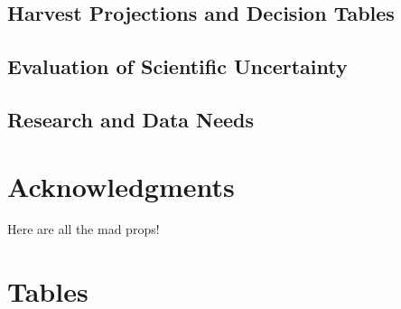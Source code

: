 \documentclass[11pt,
  english,
  a4paper,
]{article}
\begin{document}
\leavevmode\tagmcend\tagstructend


\hypertarget{harvest-projections-and-decision-tables}{%
\subsection{Harvest Projections and Decision Tables}\label{harvest-projections-and-decision-tables}}

\leavevmode\tagmcend\tagstructend


\hypertarget{evaluation-of-scientific-uncertainty}{%
\subsection{Evaluation of Scientific Uncertainty}\label{evaluation-of-scientific-uncertainty}}

\leavevmode\tagmcend\tagstructend


\hypertarget{research-and-data-needs-1}{%
\subsection{Research and Data Needs}\label{research-and-data-needs-1}}

\leavevmode\tagmcend\tagstructend


\hypertarget{acknowledgments}{%
\section{Acknowledgments}\label{acknowledgments}}

\leavevmode\tagmcend\tagstructend


Here are all the mad props!

\leavevmode\tagmcend\tagstructend\par


\hypertarget{tables}{%
\section{Tables}\label{tables}}
\end{document}
